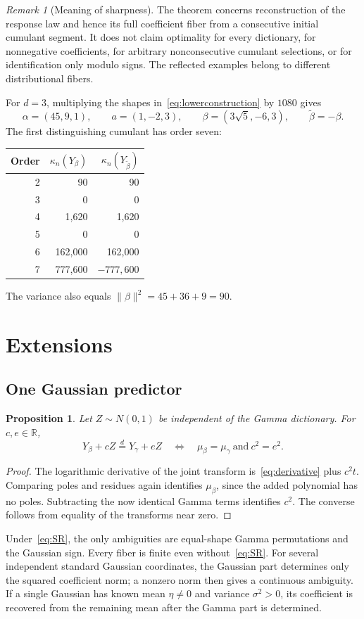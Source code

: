 \documentclass[11pt]{article}
\newtheorem{proposition}[theorem]{Proposition}
\theoremstyle{definition}\newtheorem{definition}[theorem]{Definition}
\theoremstyle{remark}\newtheorem{remark}[theorem]{Remark}
\newcommand{\R}{\mathbb R}
\newcommand{\eqd}{\overset{d}{=}}
\begin{document}
\begin{remark}[Meaning of sharpness]
The theorem concerns reconstruction of the response law and hence its full coefficient fiber from a consecutive initial cumulant segment. It does not claim optimality for every dictionary, for nonnegative coefficients, for arbitrary nonconsecutive cumulant selections, or for identification only modulo signs. The reflected examples belong to different distributional fibers.
\end{remark}

For $d=3$, multiplying the shapes in~\eqref{eq:lowerconstruction} by $1080$ gives
\[
 \alpha=(45,9,1),\qquad a=(1,-2,3),\qquad
 \beta=(3\sqrt5,-6,3),\qquad\widetilde\beta=-\beta.
\]
The first distinguishing cumulant has order seven:
\begin{center}
\begin{tabular}{rrr}
\toprule
Order & $\kappa_n(Y_\beta)$ & $\kappa_n(Y_{\widetilde\beta})$\\
\midrule
2 & 90 & 90\\
3 & 0 & 0\\
4 & 1,620 & 1,620\\
5 & 0 & 0\\
6 & 162,000 & 162,000\\
7 & 777,600 & $-777,600$\\
\bottomrule
\end{tabular}
\end{center}
The variance also equals $\|\beta\|^2=45+36+9=90$.

\section{Extensions}\label{sec:extensions}
\subsection{One Gaussian predictor}
\begin{proposition}\label{prop:gaussian}
Let $Z\sim N(0,1)$ be independent of the Gamma dictionary. For $c,e\in\R$,
\[
 Y_\beta+cZ\eqd Y_\gamma+eZ
 \quad\Longleftrightarrow\quad
 \mu_\beta=\mu_\gamma\ \text{and}\ c^2=e^2.
\]
\end{proposition}
\begin{proof}
The logarithmic derivative of the joint transform is~\eqref{eq:derivative} plus $c^2t$. Comparing poles and residues again identifies $\mu_\beta$, since the added polynomial has no poles. Subtracting the now identical Gamma terms identifies $c^2$. The converse follows from equality of the transforms near zero.
\end{proof}
Under~\eqref{eq:SR}, the only ambiguities are equal-shape Gamma permutations and the Gaussian sign. Every fiber is finite even without~\eqref{eq:SR}. For several independent standard Gaussian coordinates, the Gaussian part determines only the squared coefficient norm; a nonzero norm then gives a continuous ambiguity. If a single Gaussian has known mean $\eta\ne0$ and variance $\sigma^2>0$, its coefficient is recovered from the remaining mean after the Gamma part is determined.
\end{document}
